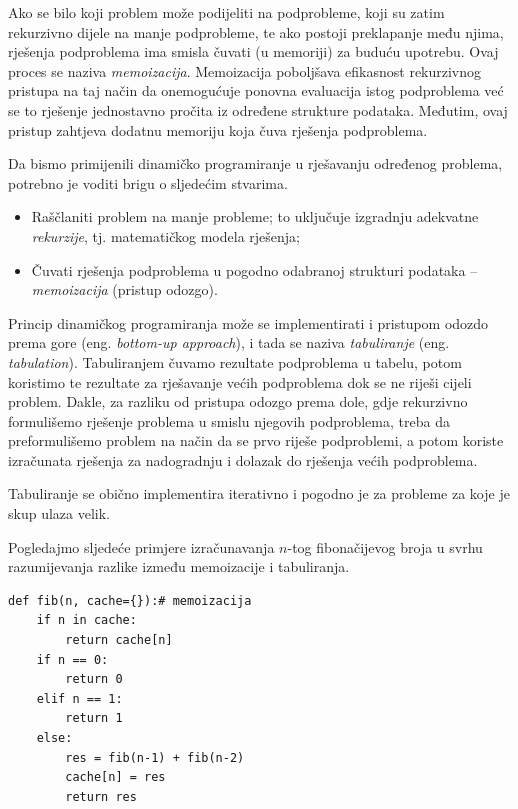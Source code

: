 Ako se bilo koji problem može podijeliti na podprobleme, koji su zatim rekurzivno dijele na manje podprobleme, te ako postoji preklapanje među   njima, rješenja podproblema ima smisla  čuvati (u memoriji) za buduću upotrebu. Ovaj proces se naziva \textit{memoizacija}. Memoizacija poboljšava efikasnost rekurzivnog pristupa na taj način da onemogućuje ponovna  evaluacija  istog podproblema već se to rješenje  jednostavno pročita iz određene strukture podataka.   Međutim, ovaj pristup zahtjeva dodatnu memoriju  koja čuva rješenja podproblema.

Da bismo primijenili dinamičko programiranje u rješavanju određenog problema, potrebno je voditi brigu o sljedećim stvarima.
\begin{itemize}
	\item Raščlaniti problem na manje probleme; to uključuje izgradnju adekvatne \textit{rekurzije}, tj. matematičkog modela rješenja; 
	\item Čuvati rješenja podproblema u pogodno odabranoj strukturi podataka -- \textit{memoizacija} (pristup odozgo).
\end{itemize}
Princip dinamičkog programiranja može se implementirati i pristupom odozdo prema gore (eng. \textit{bottom-up approach}), i tada se naziva \textit{tabuliranje} (eng. \textit{tabulation}). Tabuliranjem čuvamo rezultate podproblema u tabelu, potom koristimo te rezultate za rješavanje većih podproblema dok se ne riješi cijeli problem. Dakle, za razliku od pristupa odozgo prema dole, gdje  rekurzivno formulišemo rješenje problema  u smislu njegovih podproblema,  treba da  preformulišemo problem na način da se prvo riješe podproblemi, a potom koriste izračunata rješenja za nadogradnju i dolazak do rješenja većih podproblema.

Tabuliranje se obično implementira iterativno i pogodno je za probleme za koje je skup ulaza velik.

Pogledajmo sljedeće primjere izračunavanja $n$-tog fibonačijevog broja u svrhu razumijevanja razlike između memoizacije i tabuliranja.   

\begin{verbatim}
def fib(n, cache={}):# memoizacija
	if n in cache:
		return cache[n]
	if n == 0:
		return 0
	elif n == 1:
		return 1
	else:
		res = fib(n-1) + fib(n-2)
		cache[n] = res
		return res
\end{verbatim}

